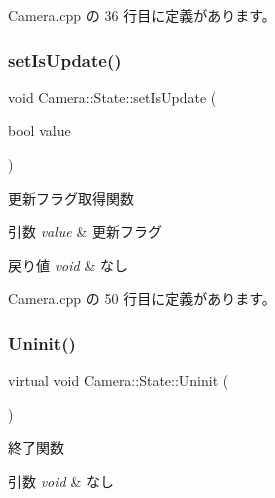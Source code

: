  Camera.\+cpp の 36 行目に定義があります。

\mbox{\label{class_camera_1_1_state_a1061b2370753de100ffd84ca877203d2}} 
\subsubsection{\texorpdfstring{set\+Is\+Update()}{setIsUpdate()}}
{\footnotesize\ttfamily void Camera\+::\+State\+::set\+Is\+Update (\begin{DoxyParamCaption}\item[{bool}]{value }\end{DoxyParamCaption})}



更新フラグ取得関数 


\begin{DoxyParams}{引数}
{\em value} & 更新フラグ \\
\hline
\end{DoxyParams}

\begin{DoxyRetVals}{戻り値}
{\em void} & なし \\
\hline
\end{DoxyRetVals}


 Camera.\+cpp の 50 行目に定義があります。

\mbox{\label{class_camera_1_1_state_adb3f43b6c3f8100da7877867180e804b}} 
\subsubsection{\texorpdfstring{Uninit()}{Uninit()}}
{\footnotesize\ttfamily virtual void Camera\+::\+State\+::\+Uninit (\begin{DoxyParamCaption}{ }\end{DoxyParamCaption})\hspace{0.3cm}{\ttfamily [pure virtual]}}



終了関数 


\begin{DoxyParams}{引数}
{\em void} & なし \\
\hline
\end{DoxyParams}


